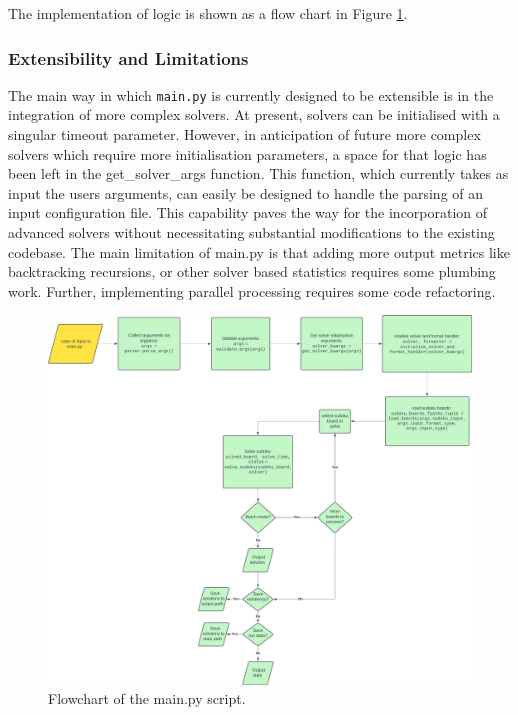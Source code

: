 \documentclass[11pt]{article}
\begin{document}
The implementation of logic is shown as a flow chart in Figure \ref{fig:main_flowchart}.

\subsubsection{Extensibility and Limitations}
The main way in which \texttt{main.py} is currently designed to be extensible is in the integration of more complex solvers. At present, solvers can be initialised with a singular timeout parameter. However, in anticipation of future more complex solvers which require more initialisation parameters, a space for that logic has been left in the get\_solver\_args function. This function, which currently takes as input the users arguments, can easily be designed to handle the parsing of an input configuration file. This capability paves the way for the incorporation of advanced solvers without necessitating substantial modifications to the existing codebase. 
The main limitation of main.py is that adding more output metrics like backtracking recursions, or other solver based statistics requires some plumbing work. Further, implementing parallel processing requires some code refactoring. 
\begin{figure}[H]
    \centering
    \includegraphics[width=1\textwidth]{figs/main_flowchart.png}
    \caption{Flowchart of the main.py script.}
    \label{fig:main_flowchart}
\end{figure}
\end{document}
